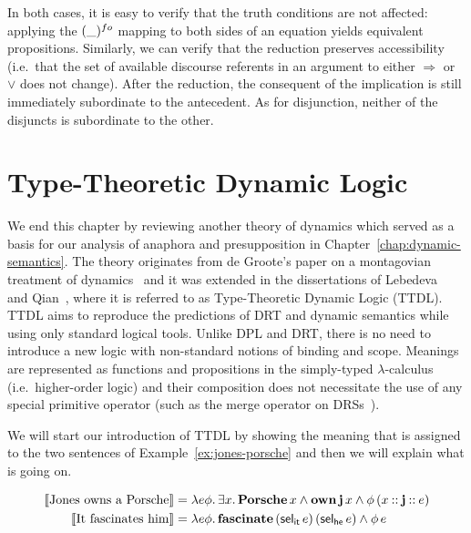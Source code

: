 In both cases, it is easy to verify that the truth conditions are not
affected: applying the $(\_)^{fo}$ mapping to both sides of an equation
yields equivalent propositions. Similarly, we can verify that the reduction
preserves accessibility (i.e.\ that the set of available discourse
referents in an argument to either $\Rightarrow$ or $\lor$ does not
change). After the reduction, the consequent of the implication is still
immediately subordinate to the antecedent. As for disjunction, neither of
the disjuncts is subordinate to the other.


\section{Type-Theoretic Dynamic Logic}
\label{sec:ttdl}

We end this chapter by reviewing another theory of dynamics which served as
a basis for our analysis of anaphora and presupposition in
Chapter~\ref{chap:dynamic-semantics}. The theory originates from de
Groote's paper on a montagovian treatment of dynamics~\cite{de2006towards}
and it was extended in the dissertations of
Lebedeva~\cite{lebedeva2012expression} and
Qian~\cite{qian2014accessibility}, where it is referred to as
Type-Theoretic Dynamic Logic (TTDL). TTDL aims to reproduce the predictions
of DRT and dynamic semantics while using only standard logical
tools. Unlike DPL and DRT, there is no need to introduce a new logic with
non-standard notions of binding and scope. Meanings are represented as
functions and propositions in the simply-typed $\lambda$-calculus (i.e.\
higher-order logic) and their composition does not necessitate the use of
any special primitive operator (such as the merge operator on
DRSs~\cite{muskens1996combining}).

We will start our introduction of TTDL by showing the meaning that is
assigned to the two sentences of Example~\ref{ex:jones-porsche} and then we
will explain what is going on.

\begin{align*}
\llbracket \text{Jones owns a Porsche} \rrbracket &=
\lambda e \phi.\, \exists x.\, \textbf{Porsche}\,x \land \textbf{own}\,\textbf{j}\,x
                          \land \phi\,(x \mathbin{::} \textbf{j} \mathbin{::} e) \\
\llbracket \text{It fascinates him} \rrbracket &= \lambda e \phi.\, \textbf{fascinate}\,(\mathsf{sel}_{\mathsf{it}}\,e)\,(\mathsf{sel}_{\mathsf{he}}\,e)
                                               \land \phi\,e
\end{align*}

